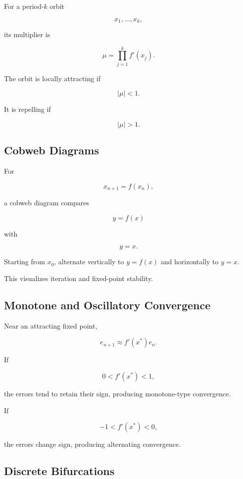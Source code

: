For a period-\(k\) orbit

\[
x_1,\ldots,x_k,
\]

its multiplier is

\[
\boxed{
\mu
=
\prod_{j=1}^{k}
f'(x_j).
}
\]

The orbit is locally attracting if

\[
\boxed{
|\mu|<1.
}
\]

It is repelling if

\[
\boxed{
|\mu|>1.
}
\]

\subsection{Cobweb Diagrams}
\label{subsec:difference-cobweb-diagrams}

For

\[
x_{n+1}=f(x_n),
\]

a cobweb diagram compares

\[
\boxed{
y=f(x)
}
\]

with

\[
\boxed{
y=x.
}
\]

Starting from \(x_0\), alternate vertically to \(y=f(x)\) and horizontally
to \(y=x\).

This visualizes iteration and fixed-point stability.

\subsection{Monotone and Oscillatory Convergence}
\label{subsec:discrete-monotone-oscillatory-convergence}

Near an attracting fixed point,

\[
e_{n+1}
\approx
f'(x^*)e_n.
\]

If

\[
0<f'(x^*)<1,
\]

the errors tend to retain their sign, producing monotone-type convergence.

If

\[
-1<f'(x^*)<0,
\]

the errors change sign, producing alternating convergence.

\subsection{Discrete Bifurcations}
\label{subsec:discrete-bifurcations}

